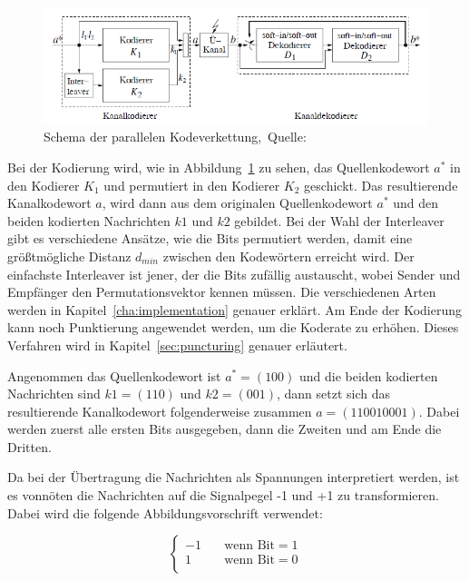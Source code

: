 \begin{figure}[th]
\centering
\includegraphics[width=\ScaleIfNeeded]{pictures/TurboModel}
\caption{Schema der parallelen Kodeverkettung,~Quelle:~\cite[251]{schoenfeld2012informations}}
\label{pic:turbomodel}
\end{figure}

Bei der Kodierung wird, wie in Abbildung~\ref{pic:turbomodel} zu sehen, das Quellenkodewort $a^*$ in den Kodierer $K_1$ und permutiert in den Kodierer $K_2$ geschickt. Das resultierende Kanalkodewort $a$, wird dann aus dem originalen Quellenkodewort $a^*$ und den beiden kodierten Nachrichten $k1$ und $k2$ gebildet. Bei der Wahl der Interleaver gibt es verschiedene Ansätze, wie die Bits permutiert werden, damit eine größtmögliche Distanz $d_{min}$ zwischen den Kodewörtern erreicht wird. Der einfachste Interleaver ist jener, der die Bits zufällig austauscht, wobei Sender und Empfänger den Permutationsvektor kennen müssen. Die verschiedenen Arten werden in Kapitel~\ref{cha:implementation} genauer erklärt. Am Ende der Kodierung kann noch Punktierung angewendet werden, um die Koderate zu erhöhen. Dieses Verfahren wird in Kapitel~\ref{sec:puncturing} genauer erläutert.

\begin{e_exa}
Angenommen das Quellenkodewort ist $a^*=(100)$ und die beiden kodierten Nachrichten sind $k1=(110)$ und $k2=(001)$, dann setzt sich das resultierende Kanalkodewort folgenderweise zusammen $a=(110010001)$. Dabei werden zuerst alle ersten Bits ausgegeben, dann die Zweiten und am Ende die Dritten.
\end{e_exa}

Da bei der Übertragung die Nachrichten als Spannungen interpretiert werden, ist es vonnöten die Nachrichten auf die Signalpegel -1 und +1 zu transformieren. Dabei wird die folgende Abbildungsvorschrift verwendet:

\begin{equation*}
	\begin{cases}
	-1 & \quad \text{wenn Bit}=1\\
	1 & \quad \text{wenn Bit}=0\\
	\end{cases}
\end{equation*}

